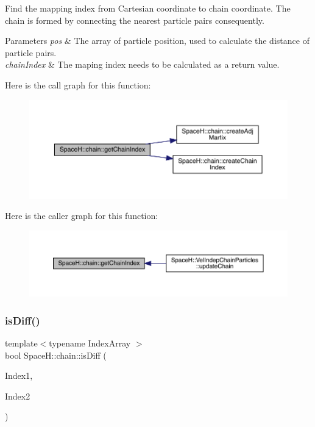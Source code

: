 Find the mapping index from Cartesian coordinate to chain coordinate. The chain is formed by connecting the nearest particle pairs consequently. 
\begin{DoxyParams}{Parameters}
{\em pos} & The array of particle position, used to calculate the distance of particle pairs. \\
\hline
{\em chain\+Index} & The maping index needs to be calculated as a return value. \\
\hline
\end{DoxyParams}
Here is the call graph for this function\+:\nopagebreak
\begin{figure}[H]
\begin{center}
\leavevmode
\includegraphics[width=350pt]{namespace_space_h_1_1chain_a9f1ed51f097bc8cf691a87b97639dde9_cgraph}
\end{center}
\end{figure}
Here is the caller graph for this function\+:
\nopagebreak
\begin{figure}[H]
\begin{center}
\leavevmode
\includegraphics[width=350pt]{namespace_space_h_1_1chain_a9f1ed51f097bc8cf691a87b97639dde9_icgraph}
\end{center}
\end{figure}
\mbox{\label{namespace_space_h_1_1chain_ab54ce920a542c01625ee7d6c625cc5c4}} 
\subsubsection{\texorpdfstring{is\+Diff()}{isDiff()}}
{\footnotesize\ttfamily template$<$typename Index\+Array $>$ \\
bool Space\+H\+::chain\+::is\+Diff (\begin{DoxyParamCaption}\item[{const Index\+Array \&}]{Index1,  }\item[{const Index\+Array \&}]{Index2 }\end{DoxyParamCaption})}



